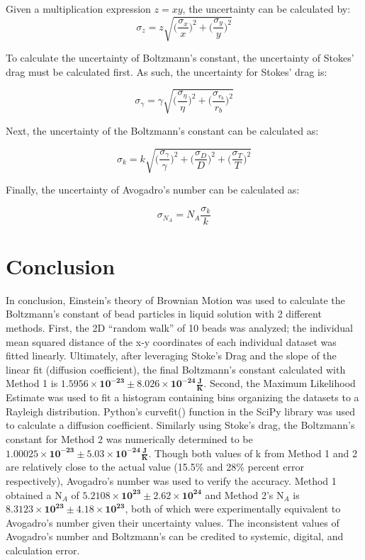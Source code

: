 \documentclass[12pt, letterpaper, twoside]{article}
\begin{document}
Given a multiplication expression $z = xy$, the uncertainty can be calculated by:
\begin{equation*}
    \sigma_z = z\sqrt{\big(\frac{\sigma_x}{x}\big)^2 + \big(\frac{\sigma_y}{y}\big)^2}
\end{equation*}

To calculate the uncertainty of Boltzmann's constant, the uncertainty of Stokes' drag must be calculated first. As such, the uncertainty for Stokes' drag is:

\begin{equation}
    \sigma_{\gamma} = \gamma\sqrt{\big(\frac{\sigma_{\eta}}{\eta}\big)^2 + \big(\frac{\sigma_{r_b}}{r_b}\big)^2}
\end{equation}

Next, the uncertainty of the Boltzmann's constant can be calculated as:

\begin{equation}
    \sigma_{k} = k\sqrt{\big(\frac{\sigma_{\gamma}}{\gamma}\big)^2 + \big(\frac{\sigma_{D}}{D}\big)^2 + \big(\frac{\sigma_{T}}{T}\big)^2}
\end{equation}

Finally, the uncertainty of Avogadro's number can be calculated as:

\begin{equation}
    \sigma_{N_A} = N_A\frac{\sigma_k}{k}
\end{equation}

\section{Conclusion}

In conclusion, Einstein’s theory of Brownian Motion was used to calculate the Boltzmann’s constant of bead particles in liquid solution with 2 different methods. First, the 2D “random walk” of 10 beads was analyzed; the individual mean squared distance of the x-y coordinates of each individual dataset was fitted linearly. Ultimately, after leveraging Stoke’s Drag and the slope of the linear fit (diffusion coefficient), the final Boltzmann’s constant calculated with Method 1 is $\bm{1.5956 \times 10^{-23} \pm 8.026\times 10^{-24} \frac{J}{K}}$. Second, the Maximum Likelihood Estimate was used to fit a histogram containing bins organizing the datasets to a Rayleigh distribution. Python’s curvefit() function in the SciPy library was used to calculate a diffusion coefficient. Similarly using Stoke’s drag, the Boltzmann’s constant for Method 2 was numerically determined to be $\bm{1.00025\times 10^{-23} \pm 5.03\times 10^{-24} \frac{J}{K}}$. Though both values of k from Method 1 and 2 are relatively close to the actual value (15.5\% and 28\% percent error respectively), Avogadro’s number was used to verify the accuracy. Method 1 obtained a N$_A$ of $\bm{5.2108\times 10^{23} \pm 2.62\times 10^{24}}$ and Method 2’s N$_A$ is $\bm{8.3123\times 10^{23} \pm 4.18 \times 10^{23}}$, both of which were experimentally equivalent to Avogadro’s number given their uncertainty values. The inconsistent values of Avogadro’s number and Boltzmann’s can be credited to systemic, digital, and calculation error. 
\end{document}
